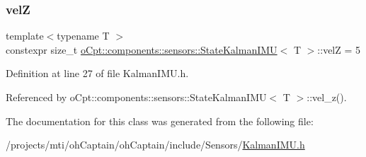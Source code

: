 \subsubsection{\texorpdfstring{velZ}{velZ}}
{\footnotesize\ttfamily template$<$typename T $>$ \\
constexpr size\+\_\+t \hyperlink{classo_cpt_1_1components_1_1sensors_1_1_state_kalman_i_m_u}{o\+Cpt\+::components\+::sensors\+::\+State\+Kalman\+I\+MU}$<$ T $>$\+::velZ = 5\hspace{0.3cm}{\ttfamily [static]}}



Definition at line 27 of file Kalman\+I\+M\+U.\+h.



Referenced by o\+Cpt\+::components\+::sensors\+::\+State\+Kalman\+I\+M\+U$<$ T $>$\+::vel\+\_\+z().



The documentation for this class was generated from the following file\+:\begin{DoxyCompactItemize}
\item 
/projects/mti/oh\+Captain/oh\+Captain/include/\+Sensors/\hyperlink{_kalman_i_m_u_8h}{Kalman\+I\+M\+U.\+h}\end{DoxyCompactItemize}

